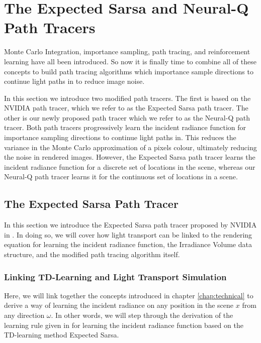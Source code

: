 \documentclass[../dissertation.tex]{subfiles}
\begin{document}
\chapter{The Expected Sarsa and Neural-Q Path Tracers}
\label{chap:td_deep_sampling}

Monte Carlo Integration, importance sampling, path tracing, and reinforcement learning have all been introduced. So now it is finally time to combine all of these concepts to build path tracing algorithms which importance sample directions to continue light paths in to reduce image noise.

In this section we introduce two modified path tracers. The first is based on the NVIDIA path tracer, which we refer to as the Expected Sarsa path tracer. The other is our newly proposed path tracer which we refer to as the Neural-Q path tracer. Both path tracers progressively learn the incident radiance function for importance sampling directions to continue light paths in. This reduces the variance in the Monte Carlo approximation of a pixels colour, ultimately reducing the noise in rendered images. However, the Expected Sarsa path tracer learns the incident radiance function for a discrete set of locations in the scene, whereas our Neural-Q path tracer learns it for the continuous set of locations in a scene.

\section{The Expected Sarsa Path Tracer}
\label{sec:expecte_sarsa_path_tracer}

In this section we introduce the Expected Sarsa path tracer proposed by NVIDIA in \cite{dahm2017learning}. In doing so, we will cover how light transport can be linked to the rendering equation for learning the incident radiance function, the Irradiance Volume data structure, and the modified path tracing algorithm itself.

\subsection{Linking TD-Learning and Light Transport Simulation}
\label{sec:td_light_transport}
Here, we will  link together the concepts introduced in chapter \ref{chap:technical} to derive a way of learning the incident radiance on any position in the scene $x$ from any direction $\omega$. In other words, we will step through the derivation of the learning rule given in \cite{dahm2017learning} for learning the incident radiance function based on the TD-learning method Expected Sarsa.
\end{document}
